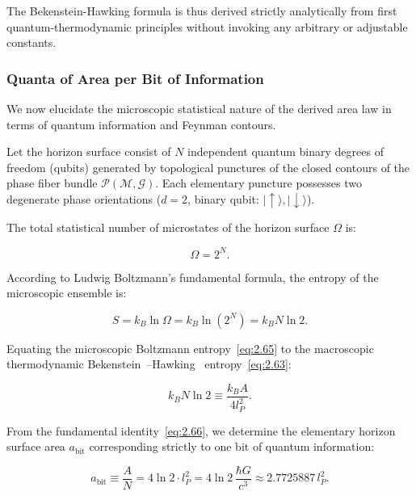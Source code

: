 The Bekenstein-Hawking formula is thus derived strictly analytically from first quantum-thermodynamic principles without invoking any arbitrary or adjustable constants.

\subsubsection{Quanta of Area per Bit of Information}\label{sec:2.6.2}

We now elucidate the microscopic statistical nature of the derived area law in terms of quantum information and Feynman contours.

Let the horizon surface consist of $N$ independent quantum binary degrees of freedom (qubits) generated by topological punctures of the closed contours of the phase fiber bundle $\mathcal{P}(\mathcal{M}, \mathcal{G})$. Each elementary puncture possesses two degenerate phase orientations ($d = 2$, binary qubit: $|\uparrow\rangle, |\downarrow\rangle$).

The total statistical number of microstates of the horizon surface $\Omega$ is:

\begin{equation}\label{eq:2.64}\label{eq:2.115}\tag{2.64}
\Omega = 2^N.
\end{equation}

According to Ludwig Boltzmann's fundamental formula, the entropy of the microscopic ensemble is:

\begin{equation}\label{eq:2.65}\label{eq:2.116}\tag{2.65}
S = k_B \ln\Omega = k_B \ln(2^N) = k_B N \ln 2.
\end{equation}

Equating the microscopic Boltzmann entropy~\eqref{eq:2.65} to the macroscopic thermodynamic Bekenstein~\cite{ref19}--Hawking~\cite{ref18} entropy~\eqref{eq:2.63}:

\begin{equation}\label{eq:2.66}\label{eq:2.117}\tag{2.66}
k_B N \ln 2 \equiv \frac{k_B A}{4 l_P^2}.
\end{equation}

From the fundamental identity~\eqref{eq:2.66}, we determine the elementary horizon surface area $a_{\text{bit}}$ corresponding strictly to one bit of quantum information:

\begin{equation}\label{eq:2.67}\label{eq:2.118}\tag{2.67}
a_{\text{bit}} \equiv \frac{A}{N} = 4\ln 2 \cdot l_P^2 = 4\ln 2 \, \frac{\hbar G}{c^3} \approx 2.7725887 \, l_P^2.
\end{equation}

